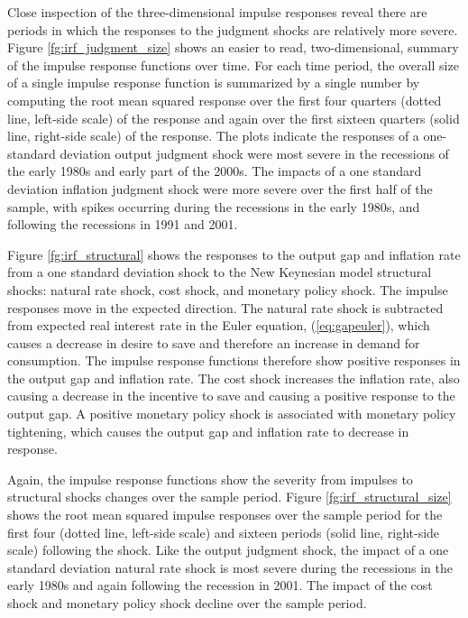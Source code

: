 \documentclass[12pt]{article}
\begin{document}
{Close inspection of the three-dimensional impulse responses reveal there are periods in which the responses to the judgment shocks are relatively more severe.  Figure \ref{fg:irf_judgment_size} shows an easier to read, two-dimensional, summary of the impulse response functions over time.  For each time period, the overall size of a single impulse response function is summarized by a single number by computing the root mean squared response over the first four quarters (dotted line, left-side scale) of the response and again over the first sixteen quarters (solid line, right-side scale) of the response.  The plots indicate the responses of a one-standard deviation output judgment shock were most severe in the recessions of the early 1980s and early part of the 2000s.  The impacts of a one standard deviation inflation judgment shock were more severe over the first half of the sample, with spikes occurring during the recessions in the early 1980s, and following the recessions in 1991 and 2001.

Figure \ref{fg:irf_structural} shows the responses to the output gap and inflation rate from a one standard deviation shock to the New Keynesian model structural shocks: natural rate shock, cost shock, and monetary policy shock.  The impulse responses move in the expected direction.  The natural rate shock is subtracted from expected real interest rate in the Euler equation, (\ref{eq:gapeuler}), which causes a decrease in desire to save and therefore an increase in demand for consumption.  The impulse response functions therefore show positive responses in the output gap and inflation rate.  The cost shock increases the inflation rate, also causing a decrease in the incentive to save and causing a positive response to the output gap.  A positive monetary policy shock is associated with monetary policy tightening, which causes the output gap and inflation rate to decrease in response.

Again, the impulse response functions show the severity from impulses to structural shocks changes over the sample period.  Figure \ref{fg:irf_structural_size} shows the root mean squared impulse responses over the sample period for the first four (dotted line, left-side scale) and sixteen periods (solid line, right-side scale) following the shock.  Like the output judgment shock, the impact of a one standard deviation natural rate shock is most severe during the recessions in the early 1980s and again following the recession in 2001.  The impact of the cost shock and monetary policy shock decline over the sample period.

}
\end{document}
